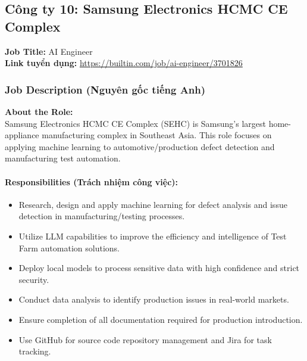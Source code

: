 \subsection{Công ty 10: Samsung Electronics HCMC CE Complex}

\noindent\textbf{Job Title:} AI Engineer \\
\textbf{Link tuyển dụng:} \url{https://builtin.com/job/ai-engineer/3701826}

\subsubsection*{Job Description (Nguyên gốc tiếng Anh)}

\textbf{About the Role:} \\
\indent Samsung Electronics HCMC CE Complex (SEHC) is Samsung's largest home-appliance manufacturing complex in Southeast Asia. This role focuses on applying machine learning to automotive/production defect detection and manufacturing test automation.

\paragraph{Responsibilities (Trách nhiệm công việc):}
\begin{itemize}
    \item Research, design and apply machine learning for defect analysis and issue detection in manufacturing/testing processes.
    \item Utilize LLM capabilities to improve the efficiency and intelligence of Test Farm automation solutions.
    \item Deploy local models to process sensitive data with high confidence and strict security.
    \item Conduct data analysis to identify production issues in real-world markets.
    \item Ensure completion of all documentation required for production introduction.
    \item Use GitHub for source code repository management and Jira for task tracking.
\end{itemize}

